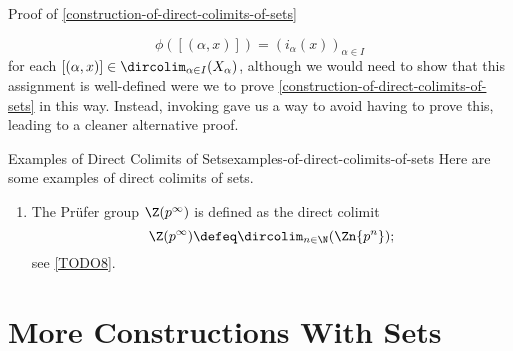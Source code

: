 \begin{Proof}{Proof of \cref{construction-of-direct-colimits-of-sets}}
{        \[
            \phi([(\alpha,x)])%
            =%
            (i_{\alpha}(x))_{\alpha\in I}
        \]%
        for each $[(\alpha,x)]\in\dircolim_{\alpha\in I}(X_{\alpha})$, although we would need to show that this assignment is well-defined were we to prove \cref{construction-of-direct-colimits-of-sets} in this way. Instead, invoking  gave us a way to avoid having to prove this, leading to a cleaner alternative proof.
        \par\vspace*{\TCBBoxCorrection}
    }%
\end{Proof}
\begin{example}{Examples of Direct Colimits of Sets}{examples-of-direct-colimits-of-sets}%
    Here are some examples of direct colimits of sets.
    \begin{enumerate}
        \item\label{examples-of-direct-colimits-of-sets-the-prüfer-group}The Prüfer group $\Z(p^{\infty})$ is defined as the direct colimit
            \[
                \Z(p^{\infty})%
                \defeq%
                \dircolim_{n\in\N}(\Zn{p^{n}});%
            \]%
            see \cref{TODO8}.
    \end{enumerate}
\end{example}
\section{More Constructions With Sets}\label{section-more-constructions-with-sets}
